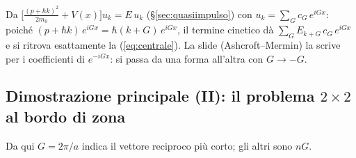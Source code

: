 \documentclass[11pt,a4paper]{article}
\begin{document}
\begin{approfondimento}
Da $\bigl[\frac{(p+\hbar k)^2}{2m_0}+V(x)\bigr]u_k=E\,u_k$ (§\ref{sec:quasiimpulso}) con $u_k=\sum_Gc_G\,e^{iGx}$: poiché $(p+\hbar k)\,e^{iGx}=\hbar(k+G)\,e^{iGx}$, il termine cinetico
dà $\sum_GE_{k+G}\,c_G\,e^{iGx}$ e si ritrova esattamente la (\ref{eq:centrale}). La slide (Ashcroft--Mermin) la scrive per i coefficienti di $e^{-iGx}$: si passa da una forma all'altra con $G\to-G$.
\end{approfondimento}

\subsection{Dimostrazione principale (II): il problema $2\times2$ al bordo di zona}\label{sec:bordo2}\label{sec:matrice}
Da qui $G=2\pi/a$ indica il vettore reciproco più corto; gli altri sono $nG$.
\end{document}
